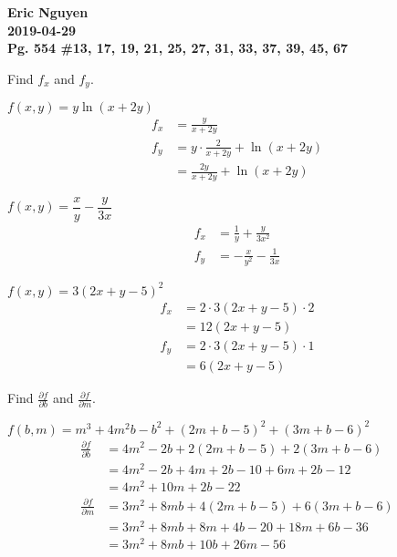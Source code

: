 \documentclass[12pt]{article}
\newenvironment{problem}[2][]{
    \begin{trivlist}
        \item[
            {\bfseries #1}
            {\bfseries #2.}
        ]
}{\end{trivlist}}
\newcommand{\assignment}{Pg. 554 \#13, 17, 19, 21, 25, 27, 31, 33, 37, 39, 45, 67}
\newcommand{\name}{Eric Nguyen}
\newcommand{\duedate}{2019-04-29}
\newcommand{\details}{\noindent\textbf{\name \\\duedate \\\assignment}}
\begin{document}
\details

\bigskip

\noindent Find $f_x$ and $f_y$.

\begin{problem}{13}
    $f(x,y) = y \ln \left(x + 2y\right)$
    \begin{align}
        f_x &= \frac{y}{x + 2y} \\
        f_y &= y \cdot \frac{2}{x + 2y} + \ln \left(x + 2y\right) \\
            &= \frac{2y}{x + 2y} + \ln \left(x + 2y\right)
    \end{align}
\end{problem}

\begin{problem}{17}
    $f(x,y) = \dfrac{x}{y} - \dfrac{y}{3x}$
    \begin{align}
        f_x &= \frac{1}{y} + \frac{y}{3x^2} \\
        f_y &= -\frac{x}{y^2} - \frac{1}{3x}
    \end{align}
\end{problem}

\begin{problem}{19}
    $f(x,y) = 3(2x + y - 5)^2$
    \begin{align}
        f_x &= 2 \cdot 3 \left(2x + y - 5\right) \cdot 2 \\
            &= 12 \left(2x + y - 5\right) \\
        f_y &= 2 \cdot 3 \left(2x + y - 5\right) \cdot 1 \\
            &= 6 \left(2x + y - 5\right)
    \end{align}
\end{problem}

\bigskip

\noindent Find $\frac{\partial f}{\partial b}$ and $\frac{\partial f}{\partial m}$.

\begin{problem}{21}
    $f(b, m) = m^3 + 4m^2 b - b^2 + \left(2m + b - 5\right)^2 + \left(3m + b - 6\right)^2$
    \begin{align}
        \frac{\partial f}{\partial b} &= 4m^2 - 2b + 2 \left(2m + b - 5\right) + 2 \left(3m + b - 6\right) \\
        &= 4m^2 - 2b + 4m + 2b - 10 + 6m + 2b - 12 \\
        &= 4m^2 + 10m + 2b - 22 \\
        \frac{\partial f}{\partial m} &= 3m^2 + 8mb + 4 \left(2m + b - 5\right) + 6 \left(3m + b - 6\right) \\
        &= 3m^2 + 8mb + 8m + 4b - 20 + 18m + 6b - 36 \\
        &= 3m^2 + 8mb + 10b + 26m - 56
    \end{align}
\end{problem}
\end{document}
